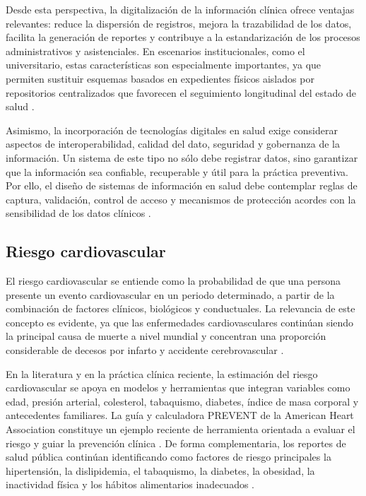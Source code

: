 Desde esta perspectiva, la digitalización de la información clínica ofrece ventajas relevantes: reduce la dispersión de registros, mejora la trazabilidad de los datos, facilita la generación de reportes y contribuye a la estandarización de los procesos administrativos y asistenciales. En escenarios institucionales, como el universitario, estas características son especialmente importantes, ya que permiten sustituir esquemas basados en expedientes físicos aislados por repositorios centralizados que favorecen el seguimiento longitudinal del estado de salud \textcite{who2025his,who2025digitalhealth}.

Asimismo, la incorporación de tecnologías digitales en salud exige considerar aspectos de interoperabilidad, calidad del dato, seguridad y gobernanza de la información. Un sistema de este tipo no sólo debe registrar datos, sino garantizar que la información sea confiable, recuperable y útil para la práctica preventiva. Por ello, el diseño de sistemas de información en salud debe contemplar reglas de captura, validación, control de acceso y mecanismos de protección acordes con la sensibilidad de los datos clínicos \textcite{who2025digitalhealth,who2025his,mdn2025security}.

\subsection{Riesgo cardiovascular}

El riesgo cardiovascular se entiende como la probabilidad de que una persona presente un evento cardiovascular en un periodo determinado, a partir de la combinación de factores clínicos, biológicos y conductuales. La relevancia de este concepto es evidente, ya que las enfermedades cardiovasculares continúan siendo la principal causa de muerte a nivel mundial y concentran una proporción considerable de decesos por infarto y accidente cerebrovascular \textcite{who2025cvd}.

En la literatura y en la práctica clínica reciente, la estimación del riesgo cardiovascular se apoya en modelos y herramientas que integran variables como edad, presión arterial, colesterol, tabaquismo, diabetes, índice de masa corporal y antecedentes familiares. La guía y calculadora PREVENT de la American Heart Association constituye un ejemplo reciente de herramienta orientada a evaluar el riesgo y guiar la prevención clínica \cite{aha2024prevent}. De forma complementaria, los reportes de salud pública continúan identificando como factores de riesgo principales la hipertensión, la dislipidemia, el tabaquismo, la diabetes, la obesidad, la inactividad física y los hábitos alimentarios inadecuados \cite{cdc2025riskfactors}.

